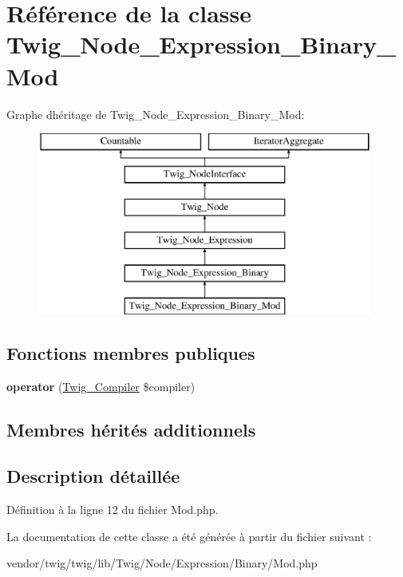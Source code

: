 \hypertarget{class_twig___node___expression___binary___mod}{}\section{Référence de la classe Twig\+\_\+\+Node\+\_\+\+Expression\+\_\+\+Binary\+\_\+\+Mod}
\label{class_twig___node___expression___binary___mod}
Graphe d\textquotesingle{}héritage de Twig\+\_\+\+Node\+\_\+\+Expression\+\_\+\+Binary\+\_\+\+Mod\+:\begin{figure}[H]
\begin{center}
\leavevmode
\includegraphics[height=6.000000cm]{class_twig___node___expression___binary___mod}
\end{center}
\end{figure}
\subsection*{Fonctions membres publiques}
\begin{DoxyCompactItemize}
\item 
{\bfseries operator} (\hyperlink{class_twig___compiler}{Twig\+\_\+\+Compiler} \$compiler)\hypertarget{class_twig___node___expression___binary___mod_af77318ec88d5f8a508684970a150b670}{}\label{class_twig___node___expression___binary___mod_af77318ec88d5f8a508684970a150b670}

\end{DoxyCompactItemize}
\subsection*{Membres hérités additionnels}


\subsection{Description détaillée}


Définition à la ligne 12 du fichier Mod.\+php.



La documentation de cette classe a été générée à partir du fichier suivant \+:\begin{DoxyCompactItemize}
\item 
vendor/twig/twig/lib/\+Twig/\+Node/\+Expression/\+Binary/Mod.\+php\end{DoxyCompactItemize}
